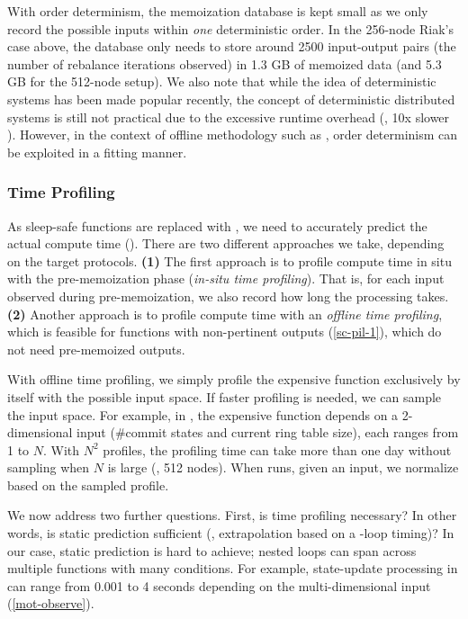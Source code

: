 %
With order determinism, the memoization database is kept small as we only
record the possible inputs within {\em one} deterministic order.  In the
256-node Riak's case above, the database only needs to store around 2500
input-output pairs (the number of rebalance iterations observed) in 1.3 GB
of memoized data (and 5.3 GB for the 512-node setup).
We also note that while the idea of deterministic systems has been made
popular recently,
the concept of deterministic distributed systems is still not practical
due to the excessive runtime overhead (\eg, 10x slower
\cite{Hunt+13-DDOS}).  However, in the context of offline methodology such
as \sck, order determinism can be exploited in a fitting manner.




\subsubsection{Time Profiling}
\label{sc-pil-4}



As sleep-safe functions are replaced with , we need to
accurately predict the actual compute time ().  There are two
different approaches we take, depending on the target protocols.
%
{\bf (1)} The first approach is to profile compute time in situ with
the pre-memoization phase ({\em in-situ time profiling}).  
That is, for each input observed during
pre-memoization, we also record how long the processing takes.
%
{\bf (2)} Another approach is to profile compute time with an {\em offline
time  profiling}, which is feasible for functions with non-pertinent outputs
(\sec\ref{sc-pil-1}), which do not need pre-memoized outputs.  

With offline time profiling, we simply profile the expensive function
exclusively by itself with the possible input space.
If faster profiling is needed, we can sample the input space.
For example, in \caone,
the expensive function depends on a 2-dimensional input (\#commit states
and current ring table size), each ranges from 1 to $N$.  
With $N^2$ profiles, the profiling time can
take more than 
one day without sampling when $N$ is large (\eg, 512 nodes).  When \sck
runs, given an input, we normalize  based on the sampled profile.

We now address two further questions.  First, is time profiling necessary?
In other words, is static prediction sufficient (\eg, extrapolation based
on a -loop timing)?  In our case, static prediction is hard
to achieve; nested loops can span across multiple functions with many
 conditions.  For example, state-update processing in
\caone can range from 0.001 to 4 seconds depending on the
multi-dimensional input (\sec\ref{mot-observe}).  
%

